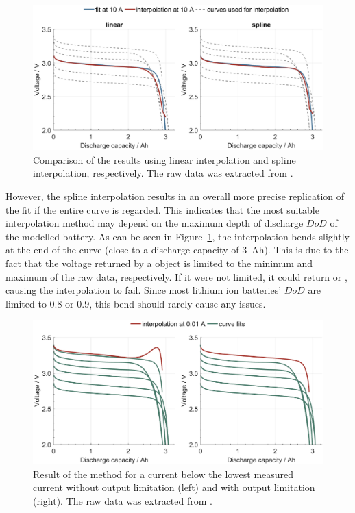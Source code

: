 \begin{figure}[hbt!]
	\captionsetup{type=figure}
	\centering
	\includegraphics[width=.97\textwidth]{interpMethod}
	\caption[Comparison of the  results using linear interpolation and spline interpolation, respectively]{Comparison of the  results using linear interpolation and spline interpolation, respectively. The raw data was extracted from \cite{_data_2010}.}
	\label{fig:interpMethod}
\end{figure}
However, the spline interpolation results in an overall more precise replication of the fit if the entire curve is regarded. This indicates that the most suitable interpolation method may depend on the maximum depth of discharge $DoD$ of the modelled battery. As can be seen in Figure~\ref{fig:interpMethod}, the interpolation bends slightly at the end of the curve (close to a discharge capacity of 3~Ah). This is due to the fact that the voltage returned by a  object is limited to the minimum and maximum of the raw data, respectively. If it were not limited, it could return  or , causing the interpolation to fail. Since most lithium ion batteries' $DoD$ are limited to 0.8 or 0.9, this bend should rarely cause any issues. \\
\begin{figure}[t!]
	\captionsetup{type=figure}
	\centering
	\includegraphics[width=.97\textwidth]{dischargeCurvesIlim}
	\caption[Result of the  method for a current below the lowest measured current without output limitation and with output limitation]{Result of the  method for a current below the lowest measured current without output limitation (left) and with output limitation (right). The raw data was extracted from \cite{_data_2010}.}
	\label{fig:dischargeCurvesIlim}
\end{figure}
